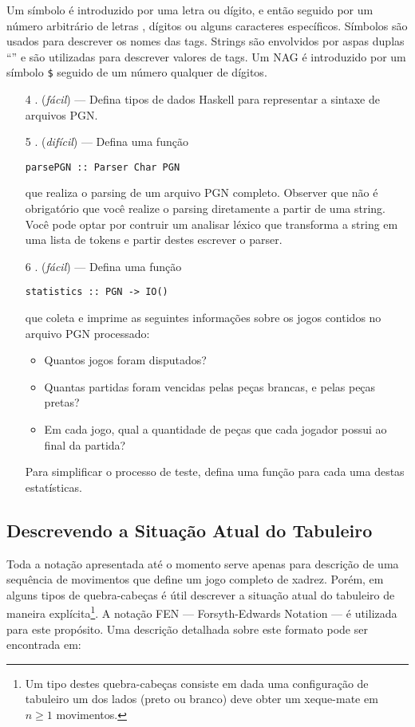\documentclass[11pt,a4paper]{article}
\begin{document}
Um s\'imbolo \'e introduzido por uma letra ou d\'igito, e ent\~ao seguido por um n\'umero arbitr\'ario de letras
, d\'igitos ou alguns caracteres espec\'ificos. S\'imbolos s\~ao usados para descrever os nomes das tags. Strings
s\~ao envolvidos por aspas duplas ``'' e s\~ao utilizadas para descrever valores de tags. Um NAG \'e introduzido
por um s\'imbolo \texttt{\$} seguido de um n\'umero qualquer de d\'igitos. 

\begin{itemize}
	\item[4 .] (\emph{f\'acil}) --- Defina tipos de dados Haskell para representar a sintaxe de arquivos PGN.
	\item[5 .] (\emph{dif\'icil}) --- Defina uma fun\c{c}\~ao
	\begin{center}
		\texttt{parsePGN :: Parser Char PGN}
	\end{center}
	que realiza o parsing de um arquivo PGN completo. Observer que n\~ao \'e obrigat\'orio 
	que voc\^e realize o parsing diretamente a partir de uma string. Voc\^e pode optar por
	contruir um analisar l\'exico que transforma a string em uma lista de tokens e partir destes
	escrever o parser.
	\item[6 .] (\emph{f\'acil}) --- Defina uma fun\c{c}\~ao
	\begin{center}
		\texttt{statistics :: PGN -> IO()}
	\end{center}
	que coleta e imprime as seguintes informa\c{c}\~oes sobre os jogos contidos no arquivo PGN processado:
	\begin{itemize}
		\item Quantos jogos foram disputados?
		\item Quantas partidas foram vencidas pelas pe\c{c}as brancas, e pelas pe\c{c}as pretas? 
		\item Em cada jogo, qual a quantidade de pe\c{c}as que cada jogador possui ao final da partida?
	\end{itemize}
	Para simplificar o processo de teste, defina uma fun\c{c}\~ao para cada uma destas estat\'isticas.
\end{itemize}

\subsection{Descrevendo a Situa\c{c}\~ao Atual do Tabuleiro}

Toda a nota\c{c}\~ao apresentada at\'e o momento serve apenas para descri\c{c}\~ao de uma sequ\^encia de movimentos 
que define um jogo completo de xadrez. Por\'em, em alguns tipos de quebra-cabe\c{c}as \'e \'util descrever a 
situa\c{c}\~ao atual do tabuleiro de maneira expl\'icita\footnote{Um tipo destes quebra-cabe\c{c}as consiste em 
dada uma configura\c{c}\~ao de tabuleiro um dos lados (preto ou branco) deve obter um xeque-mate em 
$n\geq 1$ movimentos.}.
A nota\c{c}\~ao FEN --- Forsyth-Edwards Notation --- \'e utilizada para este prop\'osito. Uma descri\c{c}\~ao
detalhada sobre este formato pode ser encontrada em:
\end{document}
